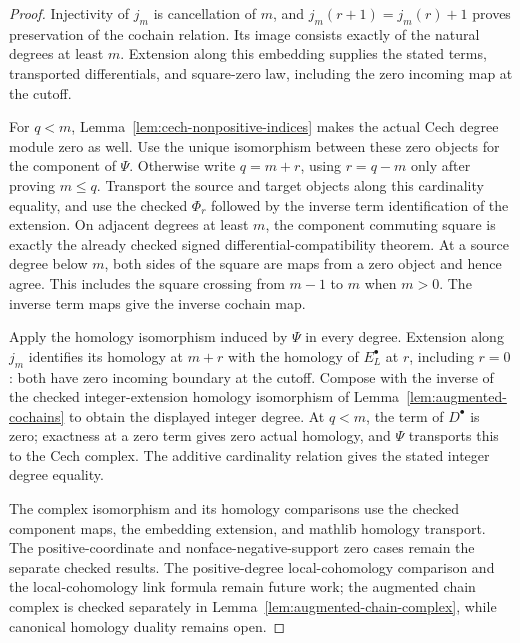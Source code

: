 \begin{proof}
\leanok
Injectivity of $j_m$ is cancellation of $m$, and
$j_m(r+1)=j_m(r)+1$ proves preservation of the cochain relation.
Its image consists exactly of the natural degrees at least $m$.
Extension along this embedding supplies the stated terms, transported
differentials, and square-zero law, including the zero incoming map at
the cutoff.

For $q<m$, Lemma~\ref{lem:cech-nonpositive-indices} makes the actual
Cech degree module zero as well. Use the unique isomorphism between
these zero objects for the component of $\Psi$. Otherwise write
$q=m+r$, using $r=q-m$ only after proving $m\leq q$.
Transport the source and target objects along this cardinality equality,
and use the checked $\Phi_r$ followed by the inverse term identification
of the extension. On adjacent degrees at least $m$, the component
commuting square is exactly the already checked signed
differential-compatibility theorem. At a source degree below $m$,
both sides of the square are maps from a zero object and hence agree.
This includes the square crossing from $m-1$ to $m$ when $m>0$.
The inverse term maps give the inverse cochain map.

Apply the homology isomorphism induced by $\Psi$ in every degree.
Extension along $j_m$ identifies its homology at $m+r$ with the
homology of $E_L^\bullet$ at $r$, including $r=0$: both have zero
incoming boundary at the cutoff. Compose with the inverse of the
checked integer-extension homology isomorphism of
Lemma~\ref{lem:augmented-cochains} to obtain the displayed integer
degree. At $q<m$, the term of $D^\bullet$ is zero; exactness at a zero
term gives zero actual homology, and $\Psi$ transports this to the
Cech complex. The additive cardinality relation gives the stated
integer degree equality.

The complex isomorphism and its homology comparisons use the checked
component maps, the embedding extension, and mathlib homology transport.
The positive-coordinate and nonface-negative-support zero cases remain
the separate checked results. The positive-degree local-cohomology
comparison and the local-cohomology link formula remain future work; the
augmented chain complex is checked separately in
Lemma~\ref{lem:augmented-chain-complex}, while canonical homology duality
remains open.
\end{proof}


